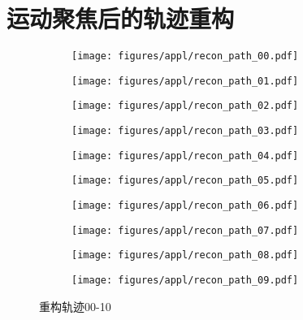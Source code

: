 \chapter{运动聚焦后的轨迹重构}
\label{ch:appl_recon}
\begin{figure}[h]
    \centering
    \begin{subfigure}[b]{0.48\textwidth}
        \texttt{[image: figures/appl/recon\_path\_00.pdf]}
    \end{subfigure}
    \begin{subfigure}[b]{0.48\textwidth}
        \texttt{[image: figures/appl/recon\_path\_01.pdf]}
    \end{subfigure}
    \begin{subfigure}[b]{0.48\textwidth}
        \texttt{[image: figures/appl/recon\_path\_02.pdf]}
    \end{subfigure}
    \begin{subfigure}[b]{0.48\textwidth}
        \texttt{[image: figures/appl/recon\_path\_03.pdf]}
    \end{subfigure}
    \begin{subfigure}[b]{0.48\textwidth}
        \texttt{[image: figures/appl/recon\_path\_04.pdf]}
    \end{subfigure}
    \begin{subfigure}[b]{0.48\textwidth}
        \texttt{[image: figures/appl/recon\_path\_05.pdf]}
    \end{subfigure}
    \begin{subfigure}[b]{0.48\textwidth}
        \texttt{[image: figures/appl/recon\_path\_06.pdf]}
    \end{subfigure}
    \begin{subfigure}[b]{0.48\textwidth}
        \texttt{[image: figures/appl/recon\_path\_07.pdf]}
    \end{subfigure}
    \begin{subfigure}[b]{0.48\textwidth}
        \texttt{[image: figures/appl/recon\_path\_08.pdf]}
    \end{subfigure}
    \begin{subfigure}[b]{0.48\textwidth}
        \texttt{[image: figures/appl/recon\_path\_09.pdf]}
    \end{subfigure}
    \caption{重构轨迹00-10}
    \label{fig:recon_00_10}
\end{figure}